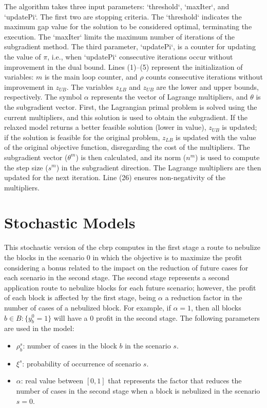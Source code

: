 The algorithm takes three input parameters: `threshold`, `maxIter`, and
`updatePi`. The first two are stopping criteria. The `threshold` indicates the
maximum gap value for the solution to be considered optimal, terminating the
execution. The `maxIter` limits the maximum number of iterations of the
subgradient method. The third parameter, `updatePi`, is a counter for updating
the value of $\pi$, i.e., when `updatePi` consecutive iterations occur without
improvement in the dual bound. Lines (1)–(5) represent the initialization of
variables: $m$ is the main loop counter, and $\rho$ counts consecutive
iterations without improvement in $z_{UB}$. The variables $z_{LB}$ and $z_{UB}$
are the lower and upper bounds, respectively. The symbol $\alpha$ represents the
vector of Lagrange multipliers, and $\theta$ is the subgradient vector. First,
the Lagrangian primal problem is solved using the current multipliers, and this
solution is used to obtain the subgradient. If the relaxed model returns a
better feasible solution (lower in value), $z_{UB}$ is updated; if the solution
is feasible for the original problem, $z_{LB}$ is updated with the value of the
original objective function, disregarding the cost of the multipliers. The
subgradient vector ($\theta^m$) is then calculated, and its norm ($n^m$) is used
to compute the step size ($s^m$) in the subgradient direction. The Lagrange
multipliers are then updated for the next iteration. Line (26) ensures
non-negativity of the multipliers.


\section{Stochastic Models}\label{sec:cbrp-stochastic-models}

This stochastic version of the \gls{cbrp} computes in the
first stage a route to nebulize the blocks in the scenario $0$ in which the
objective is to maximize the profit considering a bonus related to the impact on
the reduction of future cases for each scenario in the second stage. The second
stage represents a second application route to nebulize blocks for each future scenario;
however, the profit of each block is affected by the first stage, being $\alpha$
a reduction factor in the number of cases of a nebulized block. For example, if
$\alpha = 1$, then all blocks $b \in B: \{y_{b}^{0} = 1\}$ will have a $0$
profit in the second stage. The following parameters are used in the model:

\begin{itemize}
	\item $\rho_{b}^{s}$: number of cases in the block $b$ in the scenario $s$.
	\item $\xi^{s}$: probability of occurrence of scenario $s$.
	\item $\alpha$: real value between $[0, 1]$ that represents the factor that
	      reduces the number of cases in the second stage when a block is nebulized in
	      the scenario $s = 0$.
\end{itemize}

